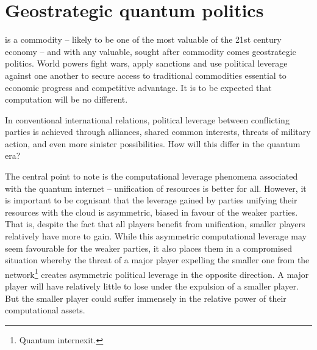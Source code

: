 \section{Geostrategic quantum politics}

\newline

\newline

 is a commodity -- likely to be one of the most valuable of the 21st century economy -- and with any valuable, sought after commodity comes geostrategic politics. World powers fight wars, apply sanctions and use political leverage against one another to secure access to traditional commodities essential to economic progress and competitive advantage. It is to be expected that computation will be no different.

In conventional international relations, political leverage between conflicting parties is achieved through alliances, shared common interests, threats of military action, and even more sinister possibilities. How will this differ in the quantum era?

The central point to note is the computational leverage phenomena associated with the quantum internet -- unification of resources is better for all. However, it is important to be cognisant that the leverage gained by parties unifying their resources with the cloud is asymmetric, biased in favour of the weaker parties. That is, despite the fact that all players benefit from unification, smaller players relatively have more to gain. While this asymmetric computational leverage may seem favourable for the weaker parties, it also places them in a compromised situation whereby the threat of a major player expelling the smaller one from the network\footnote{Quantum internexit.} creates asymmetric political leverage in the opposite direction. A major player will have relatively little to lose under the expulsion of a smaller player. But the smaller player could suffer immensely in the relative power of their computational assets.

